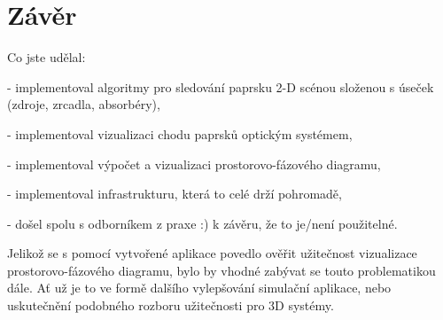 \chapter{Závěr}


Co jste udělal:

- implementoval algoritmy pro sledování paprsku 2-D scénou složenou s
úseček (zdroje, zrcadla, absorbéry),

- implementoval vizualizaci chodu paprsků optickým systémem,

- implementoval výpočet a vizualizaci prostorovo-fázového diagramu,

- implementoval infrastrukturu, která to celé drží pohromadě,

- došel spolu s odborníkem z praxe :) k závěru, že to je/není použitelné.



Jelikož se s pomocí vytvořené aplikace povedlo ověřit užitečnost vizualizace prostorovo-fázového diagramu, bylo by vhodné zabývat se touto problematikou dále. Ať už je to ve formě dalšího vylepšování simulační aplikace, nebo uskutečnění podobného rozboru užitečnosti pro 3D systémy.
